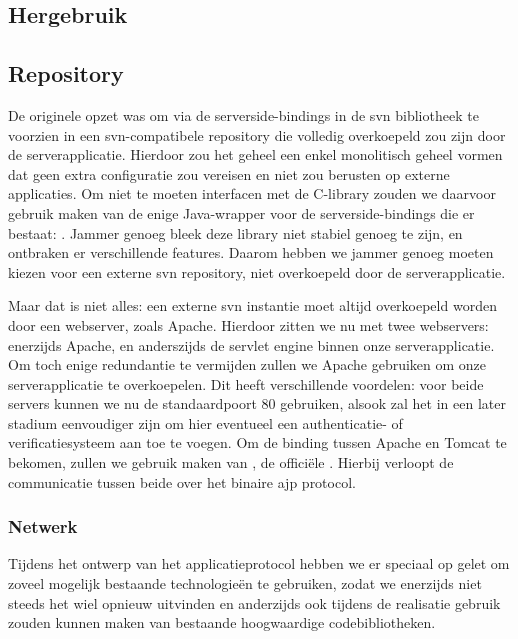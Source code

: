\subsection{Hergebruik}

\subsection{Repository}

De originele opzet was om via de serverside-bindings in de \ac{svn} bibliotheek te voorzien in een \ac{svn}-compatibele repository die volledig overkoepeld zou zijn door de serverapplicatie. Hierdoor zou het geheel een enkel monolitisch geheel vormen dat geen extra configuratie zou vereisen en niet zou berusten op externe applicaties. Om niet te moeten interfacen met de C-library zouden we daarvoor gebruik maken van de enige Java-wrapper voor de serverside-bindings die er bestaat: . Jammer genoeg bleek deze library niet stabiel genoeg te zijn, en ontbraken er verschillende features. Daarom hebben we jammer genoeg moeten kiezen voor een externe \ac{svn} repository, niet overkoepeld door de serverapplicatie.

Maar dat is niet alles: een externe \ac{svn} instantie moet altijd overkoepeld worden door een webserver, zoals Apache. Hierdoor zitten we nu met twee webservers: enerzijds Apache, en anderszijds de servlet engine binnen onze serverapplicatie. Om toch enige redundantie te vermijden zullen we Apache gebruiken om onze serverapplicatie te overkoepelen. Dit heeft verschillende voordelen: voor beide servers kunnen we nu de standaardpoort 80 gebruiken, alsook zal het in een later stadium eenvoudiger zijn om hier eventueel een authenticatie- of verificatiesysteem aan toe te voegen. Om de binding tussen Apache en Tomcat te bekomen, zullen we gebruik maken van , de officiële . Hierbij verloopt de communicatie tussen beide over het binaire \ac{ajp} protocol.

\subsubsection{Netwerk}

Tijdens het ontwerp van het applicatieprotocol hebben we er speciaal op gelet om zoveel mogelijk bestaande technologieën te gebruiken, zodat we enerzijds niet steeds het wiel opnieuw uitvinden en anderzijds ook tijdens de realisatie gebruik zouden kunnen maken van bestaande hoogwaardige codebibliotheken.

